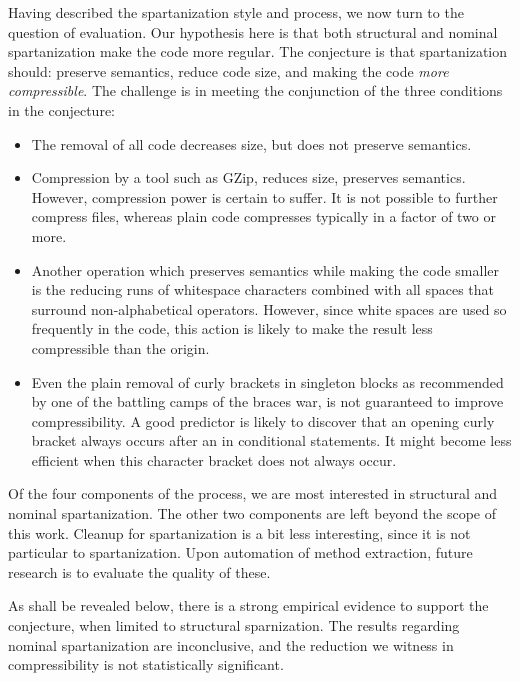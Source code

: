 
Having described the spartanization style and process, we now turn to the
question of evaluation. Our hypothesis here is that both structural and
nominal spartanization make the code more regular. The conjecture is that
spartanization should: preserve semantics, reduce code size, and making the
code \emph{more compressible}. The challenge is in meeting the conjunction of
the three conditions in the conjecture:
\begin{itemize}
    \item The removal of all code decreases size, but does not preserve semantics.
    \item Compression by a tool such as GZip, reduces size, preserves
      semantics. However, compression power is certain to suffer. It is
      not possible to further compress  files, whereas plain code
      compresses typically in a factor of two or more.
    \item Another operation which preserves semantics while making
      the code smaller is the reducing runs of whitespace characters combined
      with all spaces that surround non-alphabetical operators.
      However, since white spaces are used so frequently in the code,
      this action is likely to make the result less compressible than the origin.
    \item Even the plain removal of curly brackets in singleton blocks as
      recommended by one of the battling camps of the braces war, is not guaranteed
      to improve compressibility. A good predictor is likely to discover that
      an opening curly bracket always occurs after an  in conditional statements.
      It might become less efficient when this character bracket does not always occur.
\end{itemize}

Of the four components of the process, we are most interested in structural and
nominal spartanization. The other two components are left beyond the scope of
this work. Cleanup for spartanization is a bit less interesting, since it is
not particular to spartanization. Upon automation of method extraction, future
research is to evaluate the quality of these.

As shall be revealed below, there is a strong empirical evidence to support
the conjecture, when limited to structural sparnization. The results regarding
nominal spartanization are inconclusive, and the reduction we witness in
compressibility is not statistically significant.

